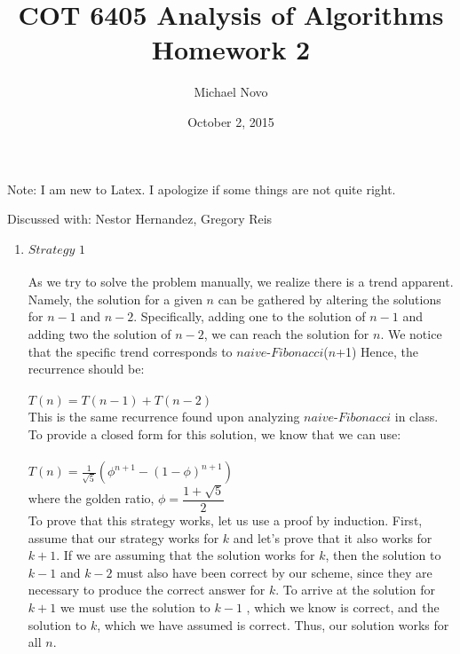 \documentclass[]{report}
\title{COT 6405 Analysis of Algorithms \\ Homework 2}
\author{Michael Novo}
\date{October 2, 2015}
\begin{document}
\maketitle


Note: I am new to Latex. I apologize if some things are not quite right. 

Discussed with: Nestor Hernandez, Gregory Reis

\begin{enumerate}
	\item  
	
	$ \textit{Strategy 1} $ \\ \\
	As we try to solve the problem manually, we realize there is a trend apparent. Namely, the solution for a given $ \textit{n} $ can be gathered by altering the solutions for $ \textit{n} - 1 $ and $ \textit{n} - 2 $. Specifically, adding one to the solution of $ \textit{n} - 1 $ and adding two the solution of $ \textit{n} - 2 $, we can reach the solution for $ \textit{n} $. We notice that the specific trend corresponds to $ \textit{naive-Fibonacci}$($ \textit{n} $+1)  Hence, the recurrence should be: \\ \\
	 $ \textit{T}(\textit{n}) =  \textit{T}(\textit{n} - 1) + \textit{T}(\textit{n} - 2)$ \\ 
	 
	  This is the same recurrence found upon analyzing $ \textit{naive-Fibonacci}$ in class. To provide a closed form for this solution, we know  that we can use: \\ \\
	  
	$ T(\textit{n}) = \frac{1}{\sqrt{5}}(\phi^{n+1}-(1-\phi)^{n+1}) $ \\ 
	
	where the golden ratio, $ \phi = \dfrac{1 + \sqrt{5}}{2} $  \\
	
	To prove that this strategy works, let us use a proof by induction. First, assume that our strategy works for $ \textit{k} $ and let's prove that it also works for $ k + 1 $. If we are assuming that the solution works for $ k $, then the solution to $ k - 1 $  and $ k - 2 $  must also have been correct by our scheme, since they are necessary to produce the correct answer for $ \textit{k} $. To arrive at the solution for $ k + 1$  we must use the solution to $ k - 1 $ , which we know is correct, and the solution to $ k $, which we have assumed is correct. Thus, our solution works for all $ n $. \\
	

\end{enumerate}
\end{document}
